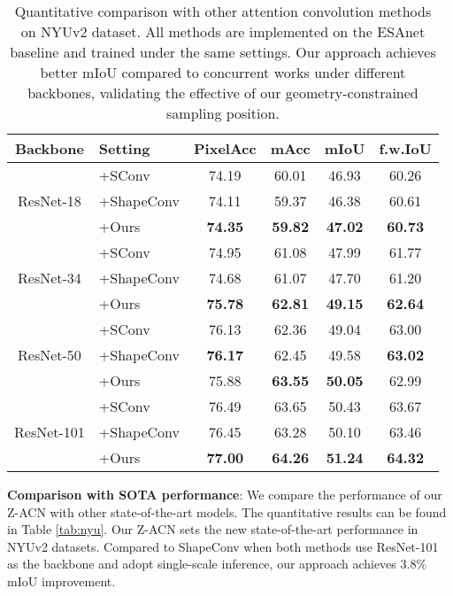 \documentclass[lettersize,journal]{IEEEtran}
\begin{document}
\begin{table}[t]
\centering
\setlength\tabcolsep{4pt}
\setlength\extrarowheight{0pt}
\caption{Quantitative comparison with other attention convolution methods on NYUv2 dataset. All methods are implemented on the ESAnet baseline and trained under the same settings. Our approach achieves better mIoU compared to concurrent works under different backbones, validating the effective of our geometry-constrained sampling position.}
\begin{tabular}[ht]{c |l | c| c | c |c }
\hline

\hline
Backbone & Setting & PixelAcc & mAcc & mIoU & f.w.IoU  \\
\hline
\multirow{3}{*}{ResNet-18}

& +SConv &74.19 & 60.01 & 46.93 & 60.26 \\
& +ShapeConv & 74.11 & 59.37 & 46.38 & 60.61\\
& +Ours & \textbf{74.35} & \textbf{59.82} & \textbf{47.02} & \textbf{60.73}\\
\hline
\multirow{3}{*}{ResNet-34} 

& +SConv & 74.95 & 61.08 & 47.99 & 61.77\\
& +ShapeConv & 74.68 & 61.07 & 47.70 & 61.20\\
& +Ours & \textbf{75.78} & \textbf{62.81} & \textbf{49.15}& \textbf{62.64}\\
\hline
\multirow{3}{*}{ResNet-50}

& +SConv & 76.13 & 62.36 & 49.04 & 63.00 \\
& +ShapeConv & \textbf{76.17} & 62.45 & 49.58 & \textbf{63.02}\\
& +Ours & 75.88 & \textbf{63.55} & \textbf{50.05} & 62.99\\
\hline
\multirow{3}{*}{ResNet-101} 

& +SConv & 76.49 & 63.65 & 50.43 & 63.67 \\
& +ShapeConv & 76.45 & 63.28 & 50.10 & 63.46\\
& +Ours &\textbf{77.00} & \textbf{64.26} & \textbf{51.24} & \textbf{64.32}\\




\hline

\hline

\hline
\end{tabular}

\label{rescomp}
\end{table}

\textbf{Comparison with SOTA performance}:
We compare the performance of our Z-ACN with other state-of-the-art models. The quantitative results can be found in Table \ref{tab:nyu}. Our Z-ACN sets the new state-of-the-art performance in NYUv2 datasets. Compared to ShapeConv when both methods use ResNet-101 as the backbone and adopt single-scale inference, our approach achieves 3.8\% mIoU improvement. 
\end{document}
